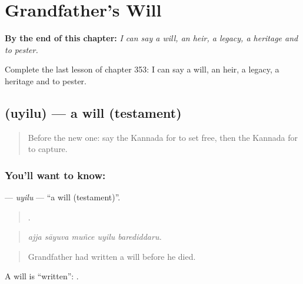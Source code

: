 
\chapter{Grandfather's Will}
\label{ch:ka-grandfather-s-will}

\begin{chapteropening}
\textbf{By the end of this chapter:} \emph{I can say a will, an heir, a legacy, a heritage and to pester.}

Complete the last lesson of chapter 353: I can say a will, an heir, a legacy, a heritage and to pester.
\end{chapteropening}

\section[\texorpdfstring{\kn{ಉಯಿಲು} (uyilu)}{ಉಯಿಲು (uyilu)}]{ (uyilu) — a will (testament)}

\label{lesson:KA-C353-uyilu}



\begin{quote}
Before the new one: say the Kannada for to set free, then the Kannada for to capture.
\end{quote}

\subsection*{You'll want to know: }
\textbf{} — \emph{uyilu} — \textquotedblleft{}a will (testament)\textquotedblright{}.

\begin{quote}
    .
\end{quote}

\begin{quote}
\emph{ajja sāyuva muñce uyilu barediddaru.}
\end{quote}

\begin{quote}
Grandfather had written a will before he died.
\end{quote}

A will is \textquotedblleft{}written\textquotedblright{}:  .

